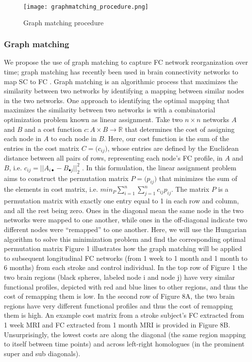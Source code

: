 \documentclass[10pt]{article}
\begin{document}
	\begin{figure}[h]
		\texttt{[image: graphmatching\_procedure.png]}
		\caption{Graph matching procedure}
		\centering
	\end{figure}
	
	\subsubsection*{Graph matching}
	We propose the use of graph matching to capture FC network reorganization over time; graph matching has recently been used in brain connectivity networks to map SC to FC \cite{Osmanlioglu2019-ao}. Graph matching is an algorithmic process that maximizes the similarity between two networks by identifying a mapping between similar nodes in the two networks. One approach to identifying the optimal mapping that maximizes the similarity between two networks is with a combinatorial optimization problem known as linear assignment. Take two $n \times n $ networks $A$ and $B$ and a cost function $c: A \times B \rightarrow  \mathbb{R}$  that determines the cost of assigning each node in $A$ to each node in $B$. Here, our cost function is the sum of the entries in the cost matrix $C = \big(c_{i j}\big)$, whose entries are defined by the Euclidean distance between all pairs of rows, representing each node’s FC profile, in $A$ and $B$, i.e. $c_{ij}=|| A_{i\bullet}-B_{\bullet j} ||^2_2$ . In this formulation, the linear assignment problem aims to construct the permutation matrix $P = \big(p_{i j}\big)$ that minimizes the sum of the elements in cost matrix, i.e. $min_P\sum^n_{i=1}\sum^n_{j=1}c_{ij}p_{ij}$. The matrix $P$ is a permutation matrix with exactly one entry equal to 1 in each row and column, and all the rest being zero. Ones in the diagonal mean the same node in the two networks were mapped to one another, while ones in the off-diagonal indicate two different nodes were “remapped” to one another. Here, we will use the Hungarian algorithm to solve this minimization problem and find the corresponding optimal permutation matrix  Figure 1 illustrates how the graph matching will be applied to subsequent longitudinal FC networks (from 1 week to 1 month and 1 month to 6 months) from each stroke and control individual. In the top row of Figure 1 the two brain regions (black spheres, labeled node i and node j) have very similar functional profiles, depicted with red and blue lines to other regions, and thus the cost of remapping them is low. In the second row of Figure 8A, the two brain regions have very different functional profiles and thus the cost of remapping them is high. An example cost matrix from a stroke subject’s FC extracted from 1 week MRI and FC extracted from 1 month MRI is provided in Figure 8B. Unsurprisingly, the lowest costs are along the diagonal (the same region mapping to itself between time points) and across left-right homologues (in the prominent super and sub diagonals).
\end{document}
